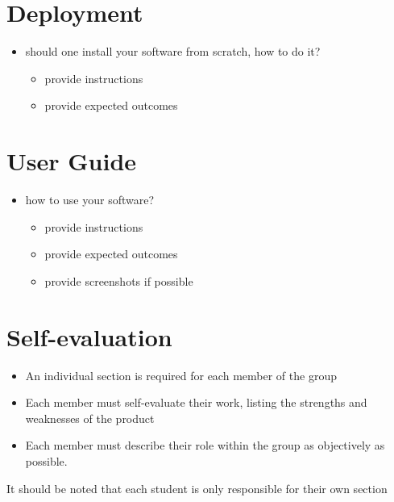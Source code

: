 \documentclass{scrartcl}
\begin{document}
\section{Deployment}\label{deployment}

\begin{itemize}
  \item should one install your software from scratch, how to do it?

  \begin{itemize}
    \item provide instructions
    \item provide expected outcomes
  \end{itemize}
\end{itemize}

\section{User Guide}\label{user-guide}

\begin{itemize}
  \item how to use your software?

  \begin{itemize}
    \item provide instructions
    \item provide expected outcomes
    \item provide screenshots if possible
  \end{itemize}
\end{itemize}

\section{Self-evaluation}\label{self-evaluation}

\begin{itemize}
  \item An individual section is required for each member of the group
  \item Each member must self-evaluate their work, listing the strengths and
  weaknesses of the product
  \item Each member must describe their role within the group as objectively
  as possible.
\end{itemize}

It should be noted that each student is only responsible for their own
section


\cite{adams1995hitchhiker} %
\end{document}

